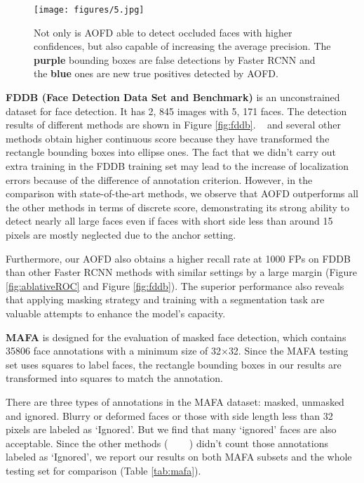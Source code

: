 \documentclass[10pt,twocolumn,letterpaper]{article}
\begin{document}
\begin{figure}[t]
	\begin{center}
		\texttt{[image: figures/5.jpg]}
	\end{center}
	\vspace{-6pt}
	\caption{Not only is AOFD able to detect occluded faces with higher confidences, but also capable of increasing the average precision. The {\bf purple} bounding boxes are false detections by  Faster RCNN and the {\bf blue} ones are new true positives detected by AOFD.}
	\vspace{-10pt}
	\label{fig:lift}
\end{figure}


\textbf{FDDB (Face Detection Data Set and Benchmark)} is an unconstrained dataset for face detection. It has 2, 845 images with 5, 171 faces. The detection results of different methods are shown in Figure \ref{fig:fddb}. 
~\cite{liu2017recurrent} and several other methods obtain higher continuous score because they have transformed the rectangle bounding boxes into ellipse ones. 
The fact that we didn't carry out extra training in the FDDB training set may lead to the increase of localization errors because of the difference of annotation criterion. However, in the comparison with state-of-the-art methods, we observe that AOFD outperforms all the other methods in terms of discrete score, demonstrating its strong ability to detect nearly all large faces even if faces with short side less than around 15 pixels are mostly neglected due to the anchor setting. 

Furthermore, our AOFD also obtains a higher recall rate at 1000 FPs on FDDB than other Faster RCNN methods with similar settings by a large margin (Figure \ref{fig:ablativeROC} and Figure \ref{fig:fddb}). 
The superior performance also reveals that applying masking strategy and training with a segmentation task are valuable attempts to enhance the model's capacity.





\textbf{MAFA} is designed for the evaluation of masked face detection, which contains 35806 face annotations with a minimum size of 32$\times$32. Since the MAFA testing set uses squares to label faces, the rectangle bounding boxes in our results are transformed into squares to match the annotation.



There are three types of annotations in the MAFA dataset: masked, unmasked and ignored. Blurry or deformed faces or those with side length less than 32 pixels are labeled as `Ignored'. But we find that many `ignored' faces are also acceptable. 
Since the other methods (~\cite{wang2017fan} ~\cite{ge2017detecting} ~\cite{zhang2016joint}) didn't count those annotations labeled as `Ignored', we report our results on both MAFA subsets and the whole testing set for comparison (Table \ref{tab:mafa}).
\end{document}
